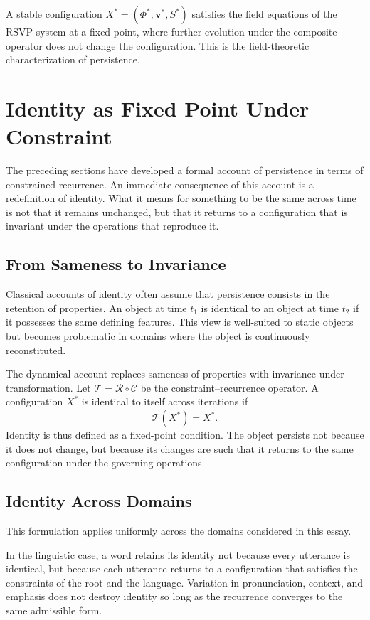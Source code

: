 \documentclass[12pt, oneside]{article}
\theoremstyle{definition}
\theoremstyle{remark}
\begin{document}
A stable configuration $X^{*} = (\Phi^{*}, \mathbf{v}^{*}, S^{*})$ satisfies the field equations of the RSVP system at a fixed point, where further evolution under the composite operator does not change the configuration.
This is the field-theoretic characterization of persistence.

\section{Identity as Fixed Point Under Constraint}

The preceding sections have developed a formal account of persistence in terms of constrained recurrence.
An immediate consequence of this account is a redefinition of identity.
What it means for something to be the same across time is not that it remains unchanged, but that it returns to a configuration that is invariant under the operations that reproduce it.

\subsection{From Sameness to Invariance}

Classical accounts of identity often assume that persistence consists in the retention of properties.
An object at time $t_{1}$ is identical to an object at time $t_{2}$ if it possesses the same defining features.
This view is well-suited to static objects but becomes problematic in domains where the object is continuously reconstituted.

The dynamical account replaces sameness of properties with invariance under transformation.
Let $\mathcal{T} = \mathcal{R} \circ \mathcal{C}$ be the constraint--recurrence operator.
A configuration $X^{*}$ is identical to itself across iterations if
\[
\mathcal{T}(X^{*}) = X^{*}.
\]
Identity is thus defined as a fixed-point condition.
The object persists not because it does not change, but because its changes are such that it returns to the same configuration under the governing operations.

\subsection{Identity Across Domains}

This formulation applies uniformly across the domains considered in this essay.

In the linguistic case, a word retains its identity not because every utterance is identical, but because each utterance returns to a configuration that satisfies the constraints of the root and the language.
Variation in pronunciation, context, and emphasis does not destroy identity so long as the recurrence converges to the same admissible form.
\end{document}
